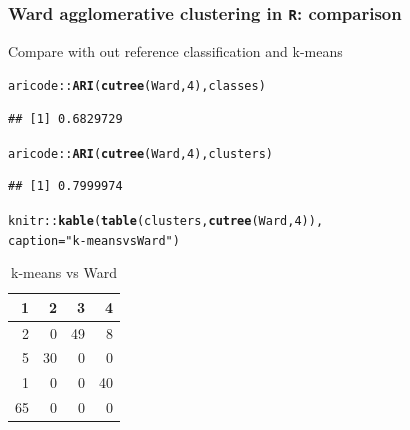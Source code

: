 \documentclass{beamer}\usepackage[]{graphicx}\usepackage[]{color}
\makeatletter
\newcommand{\hlnum}[1]{\textcolor[rgb]{0.686,0.059,0.569}{#1}}%
\newcommand{\hlstr}[1]{\textcolor[rgb]{0.192,0.494,0.8}{#1}}%
\newcommand{\hlopt}[1]{\textcolor[rgb]{0,0,0}{#1}}%
\newcommand{\hlstd}[1]{\textcolor[rgb]{0.345,0.345,0.345}{#1}}%
\newcommand{\hlkwc}[1]{\textcolor[rgb]{0.333,0.667,0.333}{#1}}%
\newcommand{\hlkwd}[1]{\textcolor[rgb]{0.737,0.353,0.396}{\textbf{#1}}}%
\newenvironment{kframe}{%
 \def\at@end@of@kframe{}%
 \ifinner\ifhmode%
  \def\at@end@of@kframe{\end{minipage}}%
  \begin{minipage}{\columnwidth}%
 \fi\fi%
 \def\FrameCommand##1{\hskip\@totalleftmargin \hskip-\fboxsep
 \colorbox{shadecolor}{##1}\hskip-\fboxsep
     \hskip-\linewidth \hskip-\@totalleftmargin \hskip\columnwidth}%
 \MakeFramed {\advance\hsize-\width
   \@totalleftmargin\z@ \linewidth\hsize
   \@setminipage}}%
 {\par\unskip\endMakeFramed%
 \at@end@of@kframe}
\newenvironment{knitrout}{}{} %
\makeatother
\begin{document}
\begin{frame}
  \frametitle{Ward agglomerative clustering in \texttt{R}: comparison}

Compare with out reference classification and k-means
\begin{knitrout}\scriptsize
{}\color{fgcolor}\begin{kframe}
\begin{alltt}
\hlstd{aricode}\hlopt{::}\hlkwd{ARI}\hlstd{(}\hlkwd{cutree}\hlstd{(Ward,} \hlnum{4}\hlstd{), classes)}
\end{alltt}
\begin{verbatim}
## [1] 0.6829729
\end{verbatim}
\begin{alltt}
\hlstd{aricode}\hlopt{::}\hlkwd{ARI}\hlstd{(}\hlkwd{cutree}\hlstd{(Ward,} \hlnum{4}\hlstd{), clusters)}
\end{alltt}
\begin{verbatim}
## [1] 0.7999974
\end{verbatim}
\end{kframe}
\end{knitrout}

\begin{knitrout}\scriptsize
{}\color{fgcolor}\begin{kframe}
\begin{alltt}
\hlstd{knitr}\hlopt{::}\hlkwd{kable}\hlstd{(}\hlkwd{table}\hlstd{(clusters,} \hlkwd{cutree}\hlstd{(Ward,}\hlnum{4}\hlstd{)),}
\hlkwc{caption} \hlstd{=} \hlstr{"k-means vs Ward"}\hlstd{)}
\end{alltt}
\end{kframe}\begin{table}

\caption{\label{tab:contingency_table_kmeans_vs_ward}k-means vs Ward}
\centering
\begin{tabular}[t]{r|r|r|r}
\hline
1 & 2 & 3 & 4\\
\hline
2 & 0 & 49 & 8\\
\hline
5 & 30 & 0 & 0\\
\hline
1 & 0 & 0 & 40\\
\hline
65 & 0 & 0 & 0\\
\hline
\end{tabular}
\end{table}


\end{knitrout}



\end{frame}
\end{document}
